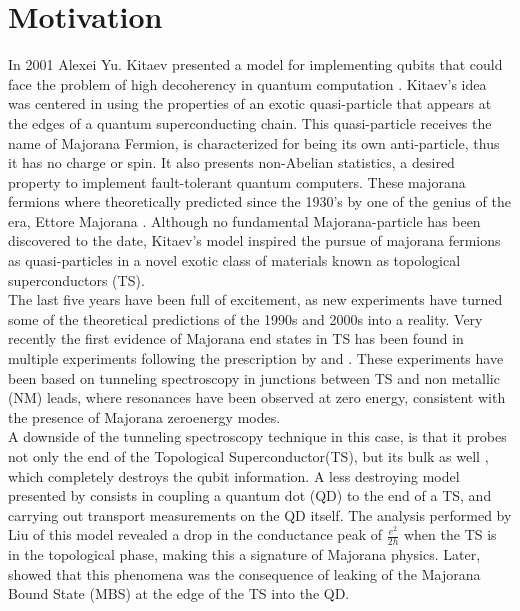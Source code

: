 \chapter{Motivation}

In 2001 Alexei Yu. Kitaev presented a model for implementing qubits
that could face the problem of high decoherency in quantum computation \citep{kitaev_unpaired_2001}. Kitaev's idea was centered in using the properties of an exotic quasi-particle that appears at the edges of a quantum superconducting chain. This quasi-particle receives the name of Majorana Fermion, is characterized for being its own anti-particle, thus it has no charge or spin. It also presents non-Abelian statistics, a desired property to implement fault-tolerant quantum computers\citep{kitaev_fault-tolerant_2003}. These majorana fermions where theoretically predicted since the 1930's by one of the genius of the era, Ettore Majorana \citep{wilczek_majorana_2009}.
Although no fundamental Majorana-particle has been discovered to the
date, Kitaev's model inspired the pursue of majorana fermions as
quasi-particles in a novel exotic class of materials known as topological
superconductors (TS)\citep{fu_superconducting_2008,sato_non-abelian_2009,alicea_new_2012}.
\\

The last five years have been full of excitement, as new experiments
have turned some of the theoretical predictions of the 1990s and 2000s
into a reality. Very recently the first evidence of Majorana end states
in TS has been found in multiple experiments \citep{mourik_signatures_2012,das_zero-bias_2012,deng_anomalous_2012}
following the prescription by \citet{oreg_helical_2010} and \citet{lutchyn_majorana_2010}.
These experiments have been based on tunneling spectroscopy in junctions
between TS and non metallic (NM) leads, where resonances have been
observed at zero energy, consistent with the presence of Majorana
zero\textendash energy modes.\\

A downside of the tunneling spectroscopy technique in this case, is
that it probes not only the end of the Topological Superconductor(TS), but its bulk as well ,
which completely destroys the qubit information. A less destroying
model presented by \citet{liu_detecting_2011} consists in coupling
a quantum dot (QD) to the end of a TS, and carrying out transport
measurements on the QD itself. The analysis performed by Liu of this
model revealed a drop in the conductance peak of $\frac{e^{2}}{2h}$
when the TS is in the topological phase, making this a signature of
Majorana physics. Later, \citet{vernek_subtle_2014} showed that this
phenomena was the consequence of leaking of the Majorana Bound State
(MBS) at the edge of the TS into the QD. \\

